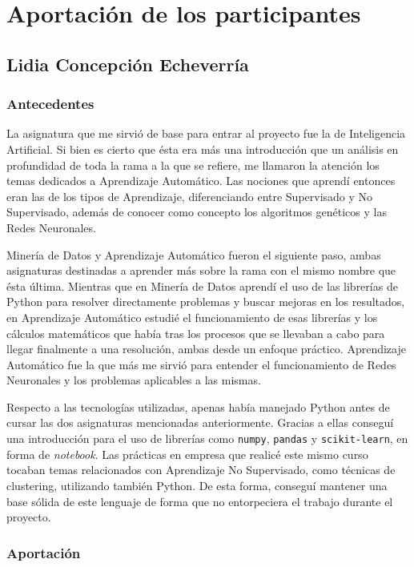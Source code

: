 \chapter{Aportación de los participantes}



\section{Lidia Concepción Echeverría}
\subsection{Antecedentes}

La asignatura que me sirvió de base para entrar al proyecto fue la de Inteligencia Artificial. Si bien es cierto que ésta era más una introducción que un análisis en profundidad de toda la rama a la que se refiere, me llamaron la atención los temas dedicados a Aprendizaje Automático. Las nociones que aprendí entonces eran las de los tipos de Aprendizaje, diferenciando entre Supervisado y No Supervisado, además de conocer como concepto los algoritmos genéticos y las Redes Neuronales. 

Minería de Datos y Aprendizaje Automático fueron el siguiente paso, ambas asignaturas destinadas a aprender más sobre la rama con el mismo nombre que ésta última. Mientras que en Minería de Datos aprendí el uso de las librerías de Python para resolver directamente problemas y buscar mejoras en los resultados, en Aprendizaje Automático estudié el funcionamiento de esas librerías y los cálculos matemáticos que había tras los procesos que se llevaban a cabo para llegar finalmente a una resolución, ambas desde un enfoque práctico. Aprendizaje Automático fue la que más me sirvió para entender el funcionamiento de Redes Neuronales y los problemas aplicables a las mismas. 

Respecto a las tecnologías utilizadas, apenas había manejado Python antes de cursar las dos asignaturas mencionadas anteriormente. Gracias a ellas conseguí una introducción para el uso de librerías como \texttt{numpy}, \texttt{pandas} y \texttt{scikit-learn}, en forma de \textit{notebook}. Las prácticas en empresa que realicé este mismo curso tocaban temas relacionados con Aprendizaje No Supervisado, como técnicas de clustering, utilizando también Python. De esta forma, conseguí mantener una base sólida de este lenguaje de forma que no entorpeciera el trabajo durante el proyecto.

\subsection{Aportación}

